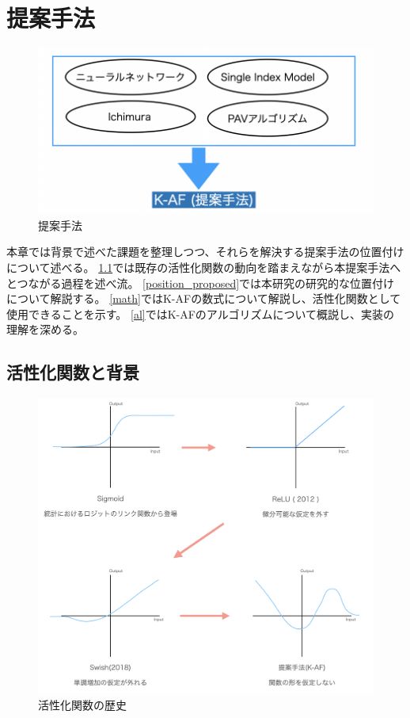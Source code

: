 \chapter{提案手法}
\label{proposed}



\begin{figure}[hbtp]
\includegraphics[width=15cm]{asset/proposed_method.png}
	\caption{提案手法}
	\label{proposed_method}
\end{figure}


本章では背景で述べた課題を整理しつつ、それらを解決する提案手法の位置付けについて述べる。
\ref{history_activation}では既存の活性化関数の動向を踏まえながら本提案手法へとつながる過程を述べ流。
\ref{position_proposed}では本研究の研究的な位置付けについて解説する。
\ref{math}ではK-AFの数式について解説し、活性化関数として使用できることを示す。
\ref{al}ではK-AFのアルゴリズムについて概説し、実装の理解を深める。




\section{活性化関数と背景}
\label {history_activation}


\begin{figure}[hbtp]
\includegraphics[width=15cm]{asset/history_af.png}
	\caption{活性化関数の歴史}
	\label{history_af}
\end{figure}


